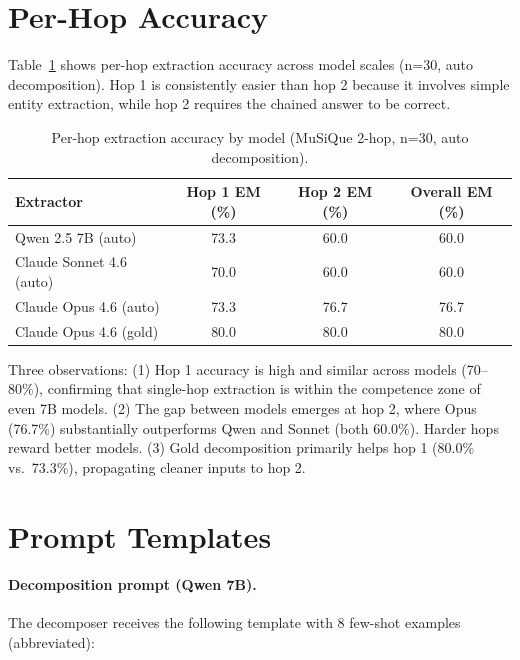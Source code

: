 \documentclass[11pt]{article}
\begin{document}
\section{Per-Hop Accuracy}
\label{app:perhop}

Table~\ref{tab:perhop} shows per-hop extraction accuracy across model scales (n=30, auto decomposition). Hop 1 is consistently easier than hop 2 because it involves simple entity extraction, while hop 2 requires the chained answer to be correct.

\begin{table}[htbp]
\centering
\caption{Per-hop extraction accuracy by model (MuSiQue 2-hop, n=30, auto decomposition).}
\label{tab:perhop}
\begin{tabular}{lccc}
\toprule
\textbf{Extractor} & \textbf{Hop 1 EM (\%)} & \textbf{Hop 2 EM (\%)} & \textbf{Overall EM (\%)} \\
\midrule
Qwen 2.5 7B (auto) & 73.3 & 60.0 & 60.0 \\
Claude Sonnet 4.6 (auto) & 70.0 & 60.0 & 60.0 \\
Claude Opus 4.6 (auto) & 73.3 & 76.7 & 76.7 \\
Claude Opus 4.6 (gold) & 80.0 & 80.0 & 80.0 \\
\bottomrule
\end{tabular}
\end{table}

Three observations: (1) Hop 1 accuracy is high and similar across models (70--80\%), confirming that single-hop extraction is within the competence zone of even 7B models. (2) The gap between models emerges at hop 2, where Opus (76.7\%) substantially outperforms Qwen and Sonnet (both 60.0\%). Harder hops reward better models. (3) Gold decomposition primarily helps hop 1 (80.0\% vs.\ 73.3\%), propagating cleaner inputs to hop 2.

\section{Prompt Templates}
\label{app:prompts}

\paragraph{Decomposition prompt (Qwen 7B).} The decomposer receives the following template with 8 few-shot examples (abbreviated):
\end{document}
